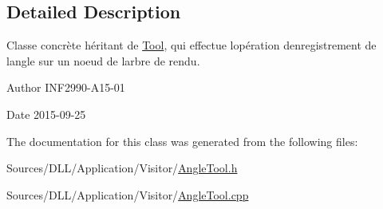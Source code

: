 \subsection{Detailed Description}
Classe concrète héritant de \hyperlink{class_tool}{Tool}, qui effectue l\textquotesingle{}opération d\textquotesingle{}enregistrement de l\textquotesingle{}angle sur un noeud de l\textquotesingle{}arbre de rendu. 

\begin{DoxyAuthor}{Author}
I\+N\+F2990-\/\+A15-\/01 
\end{DoxyAuthor}
\begin{DoxyDate}{Date}
2015-\/09-\/25 
\end{DoxyDate}


The documentation for this class was generated from the following files\+:\begin{DoxyCompactItemize}
\item 
Sources/\+D\+L\+L/\+Application/\+Visitor/\hyperlink{_angle_tool_8h}{Angle\+Tool.\+h}\item 
Sources/\+D\+L\+L/\+Application/\+Visitor/\hyperlink{_angle_tool_8cpp}{Angle\+Tool.\+cpp}\end{DoxyCompactItemize}
